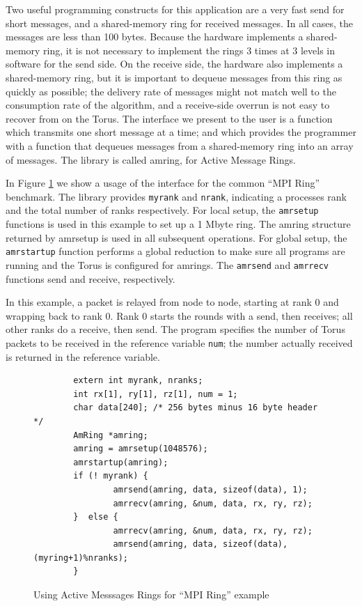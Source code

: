 \documentclass[letterpaper,twocolumn,10pt]{article}
\begin{document}
Two useful programming constructs for this application are a very fast send for short messages, and a shared-memory ring for received
messages. In all cases, the messages are less than 100 bytes. 
Because the hardware implements a shared-memory ring, it is not necessary to implement the rings 3 times at 3 levels in software for the send side. On the receive side, the hardware also 
implements a shared-memory ring, but it is important to dequeue messages from this ring as quickly as possible; the delivery rate of messages might not match well to the consumption rate of the 
algorithm, and a receive-side overrun is not easy to recover from on the Torus. The interface we present to the user is a function which transmits one short message at a time; and which 
provides the programmer with a function that dequeues messages from a shared-memory ring into an array of messages. The library is called amring, for Active Message Rings. 

In Figure \ref{amringexample} we show a usage of the interface for the common ``MPI Ring'' benchmark. The library provides {\tt myrank} and {\tt nrank}, indicating a processes
rank and the total number of ranks respectively. For local setup, the  {\tt amrsetup} functions is used 
in this example  to set up a 1 Mbyte ring.  The amring structure returned by amrsetup is used in all subsequent operations. 
For global setup, the {\tt amrstartup} function performs a global reduction to make sure all 
programs are running and the Torus is configured for amrings. The {\tt amrsend} and {\tt amrrecv} functions send and receive, 
respectively. 

In this example, a packet is relayed from node to node, starting at rank 0 and wrapping back to rank
0. 
Rank 0 starts the rounds with a send, then receives; all other ranks do a 
receive, then send. The program specifies the number of Torus packets to be received in the reference variable {\tt num}; the number
actually received is returned in the reference variable.

\begin{figure}
\begin{verbatim}
        extern int myrank, nranks;
        int rx[1], ry[1], rz[1], num = 1;
        char data[240]; /* 256 bytes minus 16 byte header */
        AmRing *amring;
        amring = amrsetup(1048576);
        amrstartup(amring);
        if (! myrank) {
                amrsend(amring, data, sizeof(data), 1);
                amrrecv(amring, &num, data, rx, ry, rz);
        }  else {
                amrrecv(amring, &num, data, rx, ry, rz);
                amrsend(amring, data, sizeof(data), (myring+1)%nranks);
        }
\end{verbatim}
\caption{\label{amringexample}Using Active Messsages Rings for ``MPI Ring'' example}
\end{figure}
\end{document}
